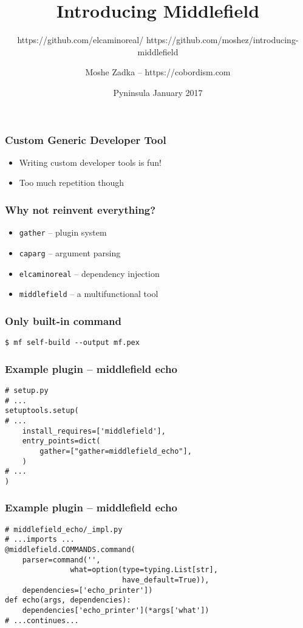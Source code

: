 \documentclass{beamer}
\title{Introducing Middlefield}
\subtitle{https://github.com/elcaminoreal/ https://github.com/moshez/introducing-middlefield}
\author{Moshe Zadka -- https://cobordism.com}
\date{Pyninsula January 2017}
\begin{document}
 
\frame{\titlepage}

\begin{frame}
\frametitle{Custom Generic Developer Tool}
\begin{itemize}
\item Writing custom developer tools is fun! \pause
\item Too much repetition though
\end{itemize}
\end{frame}

\begin{frame}[fragile]
\frametitle{Why not reinvent everything?}
\begin{itemize}
\item \verb|gather| -- plugin system
\item \verb|caparg| -- argument parsing
\item \verb|elcaminoreal| -- dependency injection
\item \verb|middlefield| -- a multifunctional tool
\end{itemize}
\end{frame}

\begin{frame}[fragile]
\frametitle{Only built-in command}
\begin{lstlisting}
$ mf self-build --output mf.pex
\end{lstlisting}
\end{frame}

\begin{frame}[fragile]
\frametitle{Example plugin -- middlefield echo}
\begin{lstlisting}
# setup.py
# ...
setuptools.setup(
# ...
    install_requires=['middlefield'],
    entry_points=dict(
        gather=["gather=middlefield_echo"],
    )
# ...
)
\end{lstlisting}
\end{frame}

\begin{frame}[fragile]
\frametitle{Example plugin -- middlefield echo}
\begin{lstlisting}
# middlefield_echo/_impl.py
# ...imports ...
@middlefield.COMMANDS.command(
    parser=command('',
               what=option(type=typing.List[str],
                           have_default=True)),
    dependencies=['echo_printer'])
def echo(args, dependencies):
    dependencies['echo_printer'](*args['what'])
# ...continues...
\end{lstlisting}
\end{frame}
\end{document}
